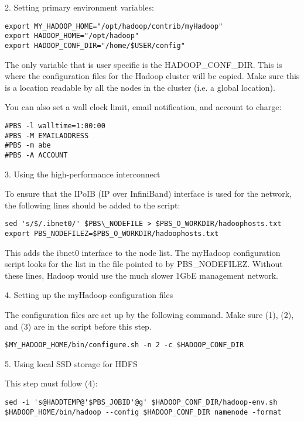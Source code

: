 2. Setting primary environment variables:

\begin{verbatim}
export MY_HADOOP_HOME="/opt/hadoop/contrib/myHadoop"
export HADOOP_HOME="/opt/hadoop"
export HADOOP_CONF_DIR="/home/$USER/config"
\end{verbatim}

The only variable that is user specific is the HADOOP_CONF_DIR. This
is where the configuration files for the Hadoop cluster will be
copied. Make sure this is a location readable by all the nodes in the
cluster (i.e. a global location).

You can also set a wall clock limit, email notification, and account
to charge:

\begin{verbatim}
#PBS -l walltime=1:00:00
#PBS -M EMAILADDRESS
#PBS -m abe
#PBS -A ACCOUNT
\end{verbatim}

3. Using the high-performance interconnect

To ensure that the IPoIB (IP over InfiniBand) interface is used for
the network, the following lines should be added to the script:

\begin{verbatim}
sed 's/$/.ibnet0/' $PBS\_NODEFILE > $PBS_O_WORKDIR/hadoophosts.txt
export PBS_NODEFILEZ=$PBS_O_WORKDIR/hadoophosts.txt
\end{verbatim}

This adds the ibnet0 interface to the node list. The myHadoop
configuration script looks for the list in the file pointed to by
PBS\_NODEFILEZ. Without these lines, Hadoop would use the much slower
1GbE management network.

4. Setting up the myHadoop configuration files

The configuration files are set up by the following command. Make sure
(1), (2), and (3) are in the script before this step.

\begin{verbatim}
$MY_HADOOP_HOME/bin/configure.sh -n 2 -c $HADOOP_CONF_DIR
\end{verbatim}

5. Using local SSD storage for HDFS

This step must follow (4):
\begin{verbatim}
sed -i 's@HADDTEMP@'$PBS_JOBID'@g' $HADOOP_CONF_DIR/hadoop-env.sh
$HADOOP_HOME/bin/hadoop --config $HADOOP_CONF_DIR namenode -format
\end{verbatim}

